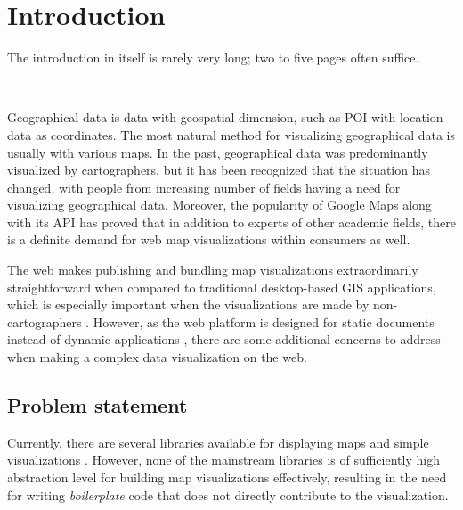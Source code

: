 
\chapter{Introduction}
\label{chapter:intro}

The introduction in itself is rarely very long; two to five pages often
suffice.

~


Geographical data is data with geospatial dimension, such as POI with location data as coordinates. The most natural method for visualizing geographical data is usually with various maps. In the past, geographical data was predominantly visualized by cartographers, but it has been recognized \citep{kraak_visualization_1999} that the situation has changed, with people from increasing number of fields having a need for visualizing geographical data. Moreover, the popularity of Google Maps \citep{google_maps_2005} along with its API \citep{google_maps_2005-1} has proved that in addition to experts of other academic fields, there is a definite demand for web map visualizations within consumers as well. 

The web makes publishing and bundling map visualizations extraordinarily straightforward when compared to traditional desktop-based GIS applications, which is especially important when the visualizations are made by non-cartographers . However, as the web platform is designed for static documents instead of dynamic applications \citep{berners-lee_information_1989,berners-lee_world-wide_1992}, there are some additional concerns to address when making a complex data visualization on the web.



\section{Problem statement}

Currently, there are several libraries available for displaying maps and simple visualizations . However, none of the mainstream libraries is of sufficiently high abstraction level for building map visualizations effectively, resulting in the need for writing \emph{boilerplate} code that does not directly contribute to the visualization.

